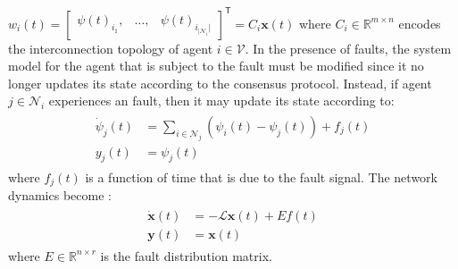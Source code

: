 \documentclass[letterpaper, 10 pt, conference]{ieeeconf}  %
\def\tT{\mathsf{T}} %
\def\cL{\mathcal{L}}
\begin{document}
$w_i(t) = \left [ \begin{array}{ccc} \psi(t)_{i_1},&\ldots,&\psi(t)_{i_{|\mathcal{N}_i}|} \end{array}\right ]^{\tT} = C_i \mathbf{x}(t)$ %
where $C_i \in \mathbb{R}^{m \times n}$ encodes the interconnection topology of agent $i \in \mathcal{V}$. 
In the presence of faults, the system model for the agent that is subject to the fault must be modified since it no longer updates its state according to the consensus protocol. Instead, if agent $j \in \mathcal{N}_i$ experiences an fault, then it may update its state according to:
\begin{gather} 
\begin{aligned} %
\dot{\psi}_j(t) &= \sum_{i \in \mathcal{N}_j} (\psi_i(t) - \psi_j(t))+f_j(t) \nonumber \\
y_j(t) &= \psi_j(t)
\end{aligned}
\end{gather}
where $f_j(t)$ is a function of time that is due to the fault signal. The network dynamics become \cite{teixeira_toward_2014}:
\begin{gather} \label{eq:globalDynActFaultSingle}
\begin{aligned} 
\dot{\mathbf{x}}(t) &= -\cL\mathbf{x}(t)+Ef(t) \\
\mathbf{y}(t) &= \mathbf{x}(t)
\end{aligned}
\end{gather}
 where $E \in \mathbb{R}^{n \times r}$ is the fault distribution matrix. %
\end{document}
